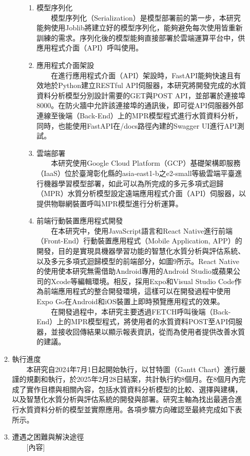 \documentclass[12pt,a4paper]{article}
\begin{document}
\begin{enumerate}
\begin{enumerate}[label=\arabic*.]
\begin{enumerate}[label=2-2-\arabic*.]
            \begin{enumerate}[label=\Alph*.]
                \item 模型序列化\\
                　　模型序列化（Serialization）是模型部署前的第一步，本研究能夠使用Joblib將建立好的模型序列化，能夠避免每次使用皆重新訓練的需求。序列化後的模型能夠直接部署於雲端運算平台中，供應用程式介面（API）呼叫使用。
                \item 應用程式介面架設\\
                　　在進行應用程式介面（API）架設時，FastAPI能夠快速且有效地於Python建立RESTful API伺服器，本研究將開發完成的水質資料分析模型分別設計需要的GET與POST API，並部署於連接埠8000。在防火牆中允許該連接埠的通訊後，即可從API伺服器外部連線至後端（Back-End）上的MPR模型程式進行水質資料分析，同時，也能使用FastAPI在/docs路徑內建的Swagger UI進行API測試。
                \item 雲端部署\\
                　　本研究使用Google Cloud Platform（GCP）基礎架構即服務（IaaS）位於臺灣彰化縣的asia-east1-b之e2-small等級雲端平臺進行機器學習模型部署，如此可以為所完成的多元多項式迴歸（MPR）水質分析模型設定遠端應用程式介面（API）伺服器，以提供物聯網裝置呼叫MPR模型進行分析運算。
                \item 前端行動裝置應用程式開發\\
                　　在本研究中，使用JavaScript語言和React Native進行前端（Front-End）行動裝置應用程式（Mobile Application, APP）的開發，目的是實現具機器學習功能的智慧化水質分析與評估系統、以及多元多項式迴歸模型的前端部分，如圖9所示。React Native的使用使本研究無需借助Android專用的Android Studio或蘋果公司的Xcode等編輯環境。相反，採用Expo和Visual Studio Code作為前端應用程式的整合開發環境，這樣可以在開發過程中使用Expo Go在Android和iOS裝置上即時預覽應用程式的效果。\\
                　　在開發過程中，本研究主要透過FETCH呼叫後端（Back-End）上的MPR模型程式，將使用者的水質資料POST至API伺服器，並接收回傳結果以顯示報表資訊，從而為使用者提供改善水質的建議。
            \end{enumerate}
    \end{enumerate}
\item 執行進度\\
　　本研究自2024年7月1日起開始執行，以甘特圖（Gantt Chart）進行嚴謹的規劃和執行，於2025年2月28日結案，共計執行約8個月。在8個月內完成了實作目標與相關內容，包括水質資料分析模型的比較、選擇與建構，以及智慧化水質分析與評估系統的開發與部署。研究主軸為找出最適合進行水質資料分析的模型並實際應用。各項步驟方向確認至最終完成如下表所示。
\item 遭遇之困難與解決途徑\\
　　[內容]
\end{enumerate}


\end{enumerate}
\end{document}
